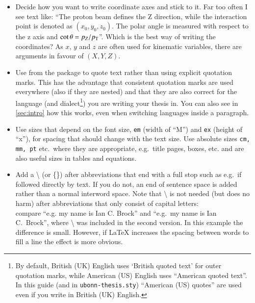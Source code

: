 \begin{itemize}
\item Decide how you want to write coordinate axes
  and stick to it. Far too often I see text like: \enquote{The proton
    beam defines the Z direction, while the interaction point is
    denoted as \((x_{0}, y_{0}, z_{0})\). The polar angle is measured
    with respect to the z axis and \(\cot\theta = p_{Z}/p_{\text{T}}\)}. Which is
  the best way of writing the coordinates? As \(x\), \(y\) and \(z\) are
  often used for kinematic variables, there are arguments in favour of
  \((X, Y, Z)\).

\item Use  from the  package to
  quote text rather than using explicit quotation marks. This has the
  advantage that consistent quotation marks are used everywhere (also
  if they are nested) and that they are also correct for the language
  (and dialect\footnote{%
    By default, British (UK) English
    uses `British quoted text' for outer quotation marks,
    while American (US) English
    uses \foreignquote{USenglish}{American quoted text}. In this guide
    (and in \texttt{ubonn-thesis.sty})
    \foreignquote{USenglish}{American (US) quotes} are used even if you
    write in British (UK) English.})
  you are writing your thesis in.
  You can also see in \cref{sec:intro} how this works, even
  when switching languages inside a paragraph.

\item Use sizes that depend on the font size, \texttt{em}
  (width of \enquote{M}) and \texttt{ex} (height of \enquote{x}), for
  spacing that should change with the text size. Use absolute sizes
  \texttt{cm, mm, pt} etc.\ where they are appropriate, e.g.\ title
  pages, boxes, etc.  and
   are also useful sizes in tables and
  equations.

\item Add a \textbackslash{} (or \{\}) after abbreviations that end with a full
  stop such as e.g.\ if followed directly by text. If you do not, an
  end of sentence space is added rather than a normal interword
  space. Note that \textbackslash{} is not needed (but does no harm)
  after abbreviations that only consist of capital letters:\\
  compare \enquote{e.g. my name is Ian C. Brock} %
  and \enquote{e.g.\ my name is Ian C.\ Brock},
  where \textbackslash{} was included in the second version. In this
  example the difference is small. However, if \LaTeX{} increases the
  spacing between words to fill a line the effect is more obvious.


\end{itemize}
